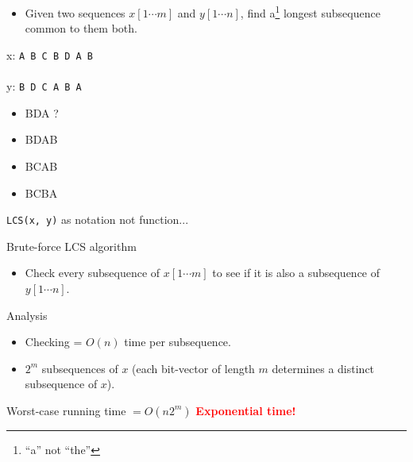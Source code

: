\documentclass{beamer}
\begin{document}
\begin{frame}{}
    \begin{itemize}
        \item Given two sequences $x[1 \cdots m]$ and $y[1 \cdots n]$, find a\footnote[2]{``a'' not ``the''} longest subsequence common to them both.
    \end{itemize} \pause
    \vspace{10mm}
    {\Huge x: \texttt{A B C B D A B}}\\
    \\
    {\Huge y: \texttt{B D C A B A}} \\
    \begin{itemize} \pause
        \item BDA ? \pause
        \item BDAB \pause
        \item BCAB \pause
        \item BCBA \pause
    \end{itemize}
    \texttt{LCS(x, y)} as notation not function...
\end{frame}

\begin{frame}{Brute-force LCS algorithm}
    \begin{itemize} \pause
        \item Check every subsequence of $x[1 \cdots m]$ to see if it is also a subsequence of $y[1 \cdots n]$.
    \end{itemize} \pause
    \begin{exampleblock}{Analysis}
        \begin{itemize}
            \item Checking = $O(n)$ time per subsequence.
            \item $2^m$ subsequences of $x$ (each bit-vector of length $m$ determines a distinct subsequence of $x$).
        \end{itemize}
        Worst-case running time $= O(n2^m)$ \pause \textcolor{red}{\textbf{Exponential time!}}
    \end{exampleblock}
\end{frame}
\end{document}
